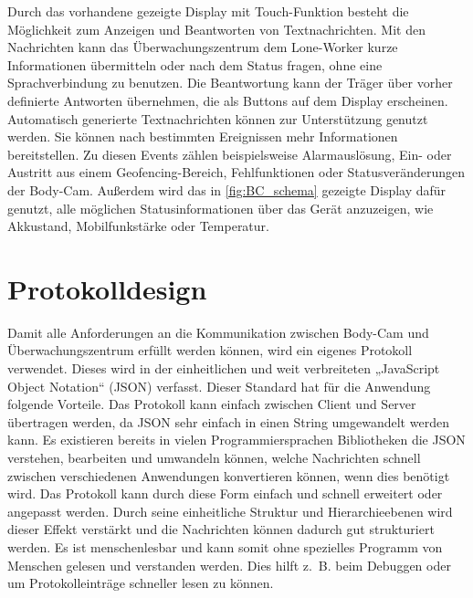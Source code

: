\documentclass[thesis.tex]{subfiles}
\begin{document}
Durch das vorhandene gezeigte Display mit Touch-Funktion besteht die Möglichkeit zum Anzeigen und Beantworten von Textnachrichten.
Mit den Nachrichten kann das Überwachungszentrum dem Lone-Worker kurze Informationen übermitteln oder nach dem Status fragen, ohne eine Sprachverbindung zu benutzen.
Die Beantwortung kann der Träger über vorher definierte Antworten übernehmen, die als Buttons auf dem Display erscheinen.
Automatisch generierte Textnachrichten können zur Unterstützung genutzt werden.
Sie können nach bestimmten Ereignissen mehr Informationen bereitstellen.
Zu diesen Events zählen beispielsweise Alarmauslösung, Ein- oder Austritt aus einem Geofencing-Bereich, Fehlfunktionen oder Statusveränderungen der Body-Cam.
Außerdem wird das in \autoref{fig:BC_schema} gezeigte Display dafür genutzt, alle möglichen Statusinformationen über das Gerät anzuzeigen, wie Akkustand, Mobilfunkstärke oder Temperatur.

\section{Protokolldesign}\label{chap:protokolldesign}
Damit alle Anforderungen an die Kommunikation zwischen Body-Cam und Überwachungszentrum erfüllt werden können, wird ein eigenes Protokoll verwendet.
Dieses wird in der einheitlichen und weit verbreiteten „JavaScript Object Notation“ (JSON) verfasst.
Dieser Standard hat für die Anwendung folgende Vorteile.
Das Protokoll kann einfach zwischen Client und Server übertragen werden, da JSON sehr einfach in einen String umgewandelt werden kann.
Es existieren bereits in vielen Programmiersprachen Bibliotheken die JSON verstehen, bearbeiten und umwandeln können, welche Nachrichten schnell zwischen verschiedenen Anwendungen konvertieren können, wenn dies benötigt wird.
Das Protokoll kann durch diese Form einfach und schnell erweitert oder angepasst werden.
Durch seine einheitliche Struktur und Hierarchieebenen wird dieser Effekt verstärkt und die Nachrichten können dadurch gut strukturiert werden.
Es ist menschenlesbar und kann somit ohne spezielles Programm von Menschen gelesen und verstanden werden.
Dies hilft z.~B. beim Debuggen oder um Protokolleinträge schneller lesen zu können. \cite[]{ecma_404}
\end{document}

